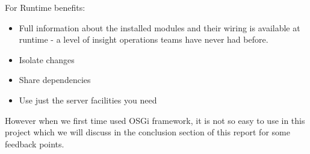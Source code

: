\documentclass{article}
\begin{document}
\par For Runtime benefits:
\begin{itemize}
	\item Full information about the installed modules and their wiring is available at runtime - a level of insight operations teams have never had before.
	\item Isolate changes
	\item Share dependencies
	\item Use just the server facilities you need
\end{itemize}

\par However when we first time used OSGi framework, it is not so easy to use in this project which we will discuss in the conclusion section of this report for some feedback points.







\printbibliography
\end{document}
